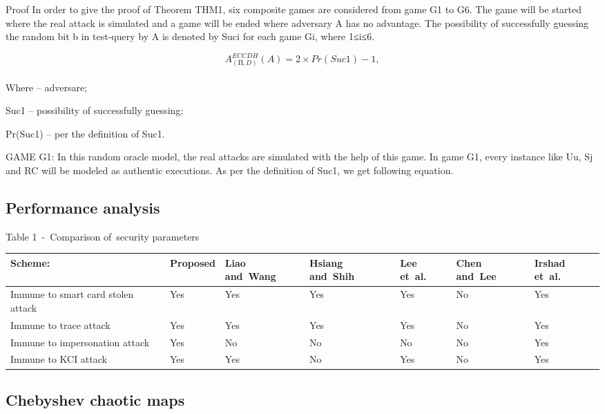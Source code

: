 \documentclass[preprint]{oscmjournal}
\begin{document}
Proof In order to give the proof of Theorem THM1, six composite games are considered from game G1 to G6. The game will be started where the real attack is simulated and a game will be ended where adversary A has no advantage. The possibility of successfully guessing the random bit b in test-query by A is denoted by Suci for each game Gi, where 1≤i≤6.
\centering

 \[
  A_{(П,D)}^{ECCDH}(A)=2 \times Pr⁡(Suc1)-1,
 \] \\
Where   – adversare;

Suc1 – possibility of successfully guessing;

Pr(Suc1) – per the definition of Suc1.

GAME G1: In this random oracle model, the real attacks are simulated with the help of this game. In game G1, every instance like Uu, Sj and RC will be modeled as authentic executions. As per the definition of Suc1, we get following equation.

\subsection{Performance analysis}

Table 1 - Comparison of security parameters

\begin{table}[h]
\centering

\begin{tabular}{| l | l | l | l | l | l | l |}
\hline
Scheme: & Proposed & Liao and Wang & Hsiang and Shih & Lee et al. & Chen and Lee & Irshad et al. \\
\hline
Immune to smart card stolen attack & Yes & Yes & Yes & Yes & No & Yes \\
\hline
Immune to trace attack & Yes & Yes & Yes & Yes & No & Yes \\
\hline
Immune to impersonation attack & Yes & No & No & No & No & Yes \\
\hline
Immune to KCI attack & Yes & Yes & No & Yes & No & Yes \\
\hline

\end{tabular}

\end{table}

 

\subsection{Chebyshev chaotic maps}
\end{document}
